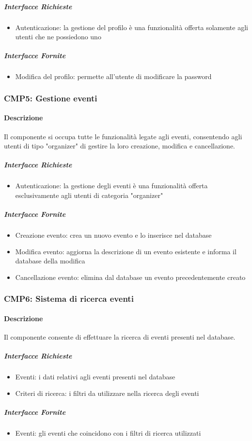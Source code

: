 \documentclass[9pt]{extarticle}
\begin{document}
\subparagraph{Interfacce Richieste}
\begin{itemize}
	\item Autenticazione: la gestione del profilo è una funzionalità offerta solamente agli utenti che ne possiedono uno
\end{itemize}
\subparagraph{Interfacce Fornite}
\begin{itemize}
	\item Modifica del profilo: permette all'utente di modificare la password
\end{itemize}

\subsubsection*{CMP5: Gestione eventi}
\paragraph{Descrizione}
Il componente si occupa tutte le funzionalità legate agli eventi, consentendo agli utenti di tipo "organizer" di gestire la loro creazione, modifica e cancellazione.

\subparagraph{Interfacce Richieste}
\begin{itemize}
	\item Autenticazione: la gestione degli eventi è una funzionalità offerta esclusivamente agli utenti di categoria "organizer"
\end{itemize}
\subparagraph{Interfacce Fornite}
\begin{itemize}
	\item Creazione evento: crea un nuovo evento e lo inserisce nel database
	\item Modifica evento: aggiorna la descrizione di un evento esistente e informa il database della modifica
	\item Cancellazione evento: elimina dal database un evento precedentemente creato
\end{itemize}

\subsubsection*{CMP6: Sistema di ricerca eventi}
\paragraph{Descrizione}
Il componente consente di effettuare la ricerca di eventi presenti nel database.
\subparagraph{Interfacce Richieste}
\begin{itemize}
	\item Eventi: i dati relativi agli eventi presenti nel database
	\item Criteri di ricerca: i filtri da utilizzare nella ricerca degli eventi
\end{itemize}
\subparagraph{Interfacce Fornite}
\begin{itemize}
	\item Eventi: gli eventi che coincidono con i filtri di ricerca utilizzati
\end{itemize}
\end{document}
